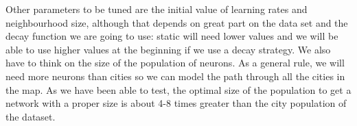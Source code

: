 \documentclass[11pt]{article}
\begin{document}
Other parameters to be tuned are the initial value of learning rates and
neighbourhood size, although that depends on great part on the data set and the
decay function we are going to use: static will need lower values and we will be
able to use higher values at the beginning if we use a decay strategy. We also
have to think on the size of the population of neurons. As a general rule, we
will need more neurons than cities so we can model the path through all the
cities in the map. As we have been able to test, the optimal size of the
population to get a network with a proper size is about 4-8 times greater than
the city population of the dataset.\\
\end{document}
